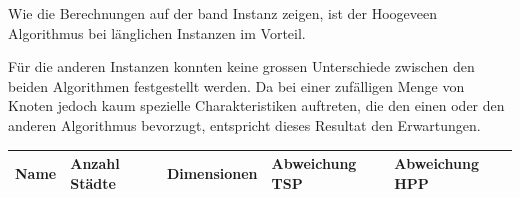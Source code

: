 \documentclass[11pt,a4paper]{article}
\begin{document}
Wie die Berechnungen auf der band Instanz zeigen, ist der Hoogeveen Algorithmus bei länglichen Instanzen im Vorteil.

Für die anderen Instanzen konnten keine grossen Unterschiede zwischen den beiden Algorithmen festgestellt werden. Da bei einer zufälligen Menge von Knoten jedoch kaum spezielle Charakteristiken auftreten, die den einen oder den anderen Algorithmus bevorzugt, entspricht dieses Resultat den Erwartungen.

    \begin{table}[H]
                \centering
                \begin{tabular}{| p{2.0cm} | p{2.0cm} | p{2.5cm} | p{2.5cm} | p{2.5cm} |}
                    \hline
                    \small{\textbf{Name}} &
                    \small{\textbf{Anzahl Städte}}  & 
                    \small{\textbf{Dimensionen}} & 
                    \small{\textbf{Abweichung TSP}} & 
                    \small{\textbf{Abweichung HPP}} \\ \hline


\end{tabular}
\end{table}
\end{document}
